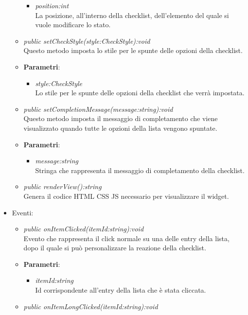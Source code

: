 \begin{itemize}
\begin{itemize}
{\begin{itemize}
		Questo booleano è a true se si vorrà spuntare la entry, a false altrimenti.
		\item \textit{position:int}\\
		La posizione, all'interno della checklist, dell'elemento del quale si vuole modificare lo stato. 
		\end{itemize}} 
	\item \textit{public setCheckStyle(style:CheckStyle):void}\\
	Questo metodo imposta lo stile per le spunte delle opzioni della checklist.
		\item{\textbf{Parametri}: \begin{itemize}
		\item \textit{style:CheckStyle}\\
		Lo stile per le spunte delle opzioni della checklist che verrà impostata.
		\end{itemize}} 
	\item \textit{public setCompletionMessage(message:string):void}\\
	Questo metodo imposta il messaggio di completamento che viene visualizzato quando tutte le opzioni della lista vengono spuntate.
		\item{\textbf{Parametri}: \begin{itemize}
		\item \textit{message:string}\\
		Stringa che rappresenta il messaggio di completamento della checklist.
		\end{itemize}}
	\item \textit{public renderView():string}\\
	Genera il codice HTML CSS JS necessario per visualizzare il widget.
	\end{itemize}
\item{Eventi}:
	\begin{itemize}
	\item \textit{public onItemClicked(itemId:string):void}\\
	Evento che rappresenta il click normale su una delle entry della lista, dopo il quale si può personalizzare la reazione della checklist.
		\item{\textbf{Parametri}: \begin{itemize}
		\item \textit{itemId:string}\\
		Id corrispondente all'entry della lista che è stata cliccata.
		\end{itemize}}
	\item \textit{public onItemLongClicked(itemId:string):void}\\

\end{itemize}
\end{itemize}
